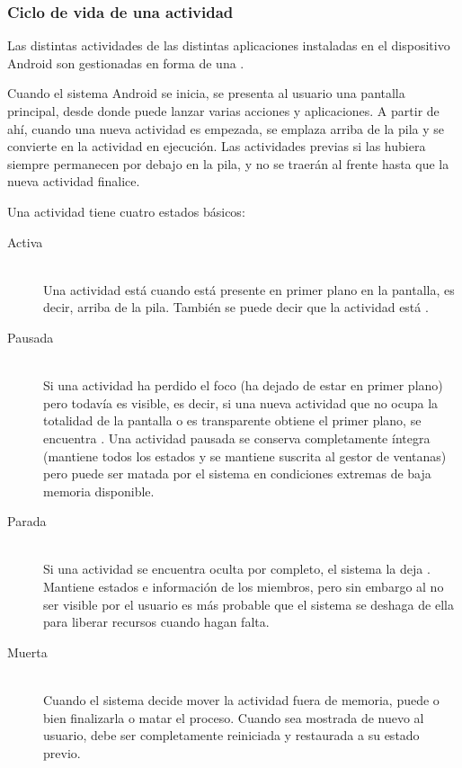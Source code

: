 \subsubsection{Ciclo de vida de una actividad}
Las distintas actividades de las distintas aplicaciones instaladas en el dispositivo Android son gestionadas en forma de una .
 
Cuando el sistema Android se inicia, se presenta al usuario una pantalla principal, desde donde puede lanzar varias acciones y aplicaciones. A partir de ahí, cuando una nueva actividad es empezada, se emplaza arriba de la pila y se convierte en la actividad en ejecución. Las actividades previas si las hubiera siempre permanecen por debajo en la pila, y no se traerán al frente hasta que la nueva actividad finalice.

Una actividad tiene cuatro estados básicos:

\begin{description}
    \item[Activa] \hfill \\
     Una actividad está  cuando está presente en primer plano en la pantalla, es decir, arriba de la pila. También se puede decir que la actividad está .

    \item[Pausada] \hfill \\
    Si una actividad ha perdido el foco (ha dejado de estar en primer plano) pero todavía es visible, es decir, si una nueva actividad que no ocupa la totalidad de la pantalla o es transparente obtiene el primer plano, se encuentra . Una actividad pausada se conserva completamente íntegra (mantiene todos los estados y se mantiene suscrita al gestor de ventanas) pero puede ser matada por el sistema en condiciones extremas de baja memoria disponible.

    \item[Parada] \hfill \\
    Si una actividad se encuentra oculta por completo, el sistema la deja . Mantiene estados e información de los miembros, pero sin embargo al no ser visible por el usuario es más probable que el sistema se deshaga de ella para liberar recursos cuando hagan falta.
    
    \item[Muerta] \hfill \\
    Cuando el sistema decide mover la actividad fuera de memoria, puede o bien finalizarla o matar el proceso. Cuando sea mostrada de nuevo al usuario, debe ser completamente reiniciada y restaurada a su estado previo.
    
\end{description}

